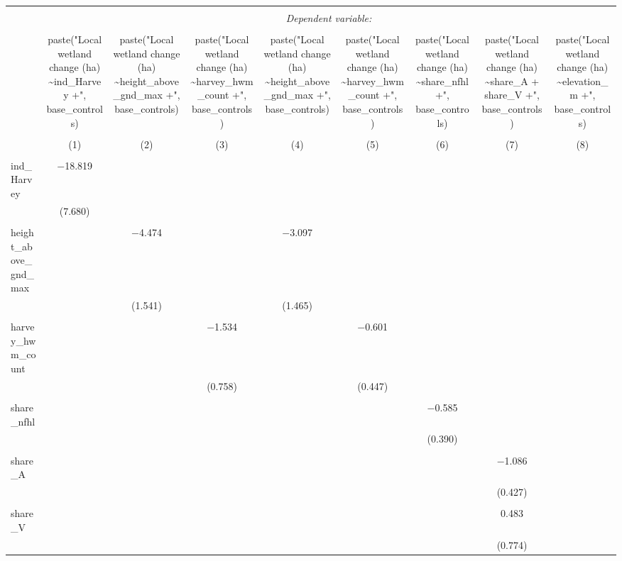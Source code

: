 \begin{tabular}{@{\extracolsep{5pt}}lcccccccc} 
\\[-1.8ex]\hline 
\hline \\[-1.8ex] 
 & \multicolumn{8}{c}{\textit{Dependent variable:}} \\ 
\cline{2-9} 
\\[-1.8ex] & paste("Local wetland change (ha) \textasciitilde ind\_Harvey +", base\_controls) & paste("Local wetland change (ha) \textasciitilde height\_above\_gnd\_max +", base\_controls) & paste("Local wetland change (ha) \textasciitilde harvey\_hwm\_count +", base\_controls) & paste("Local wetland change (ha) \textasciitilde height\_above\_gnd\_max +", base\_controls) & paste("Local wetland change (ha) \textasciitilde harvey\_hwm\_count +", base\_controls) & paste("Local wetland change (ha) \textasciitilde share\_nfhl +", base\_controls) & paste("Local wetland change (ha) \textasciitilde share\_A + share\_V +", base\_controls) & paste("Local wetland change (ha) \textasciitilde elevation\_m +", base\_controls) \\ 
\\[-1.8ex] & (1) & (2) & (3) & (4) & (5) & (6) & (7) & (8)\\ 
\hline \\[-1.8ex] 
 ind\_Harvey & $-$18.819 &  &  &  &  &  &  &  \\ 
  & (7.680) &  &  &  &  &  &  &  \\ 
  & & & & & & & & \\ 
 height\_above\_gnd\_max &  & $-$4.474 &  & $-$3.097 &  &  &  &  \\ 
  &  & (1.541) &  & (1.465) &  &  &  &  \\ 
  & & & & & & & & \\ 
 harvey\_hwm\_count &  &  & $-$1.534 &  & $-$0.601 &  &  &  \\ 
  &  &  & (0.758) &  & (0.447) &  &  &  \\ 
  & & & & & & & & \\ 
 share\_nfhl &  &  &  &  &  & $-$0.585 &  &  \\ 
  &  &  &  &  &  & (0.390) &  &  \\ 
  & & & & & & & & \\ 
 share\_A &  &  &  &  &  &  & $-$1.086 &  \\ 
  &  &  &  &  &  &  & (0.427) &  \\ 
  & & & & & & & & \\ 
 share\_V &  &  &  &  &  &  & 0.483 &  \\ 
  &  &  &  &  &  &  & (0.774) &  \\ 

\end{tabular}
